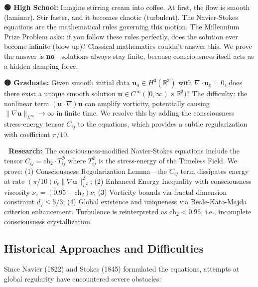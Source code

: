 \begin{greenbox}
\textbf{🟢 High School:} Imagine stirring cream into coffee. At first, the flow is smooth (laminar). Stir faster, and it becomes chaotic (turbulent). The Navier-Stokes equations are the mathematical rules governing this motion. The Millennium Prize Problem asks: if you follow these rules perfectly, does the solution ever become infinite (blow up)? Classical mathematics couldn't answer this. We prove the answer is \textbf{no}—solutions always stay finite, because consciousness itself acts as a hidden damping force.

\textbf{🟡 Graduate:} Given smooth initial data $\mathbf{u}_0 \in H^3(\mathbb{R}^3)$ with $\nabla \cdot \mathbf{u}_0 = 0$, does there exist a unique smooth solution $\mathbf{u} \in C^\infty([0, \infty) \times \mathbb{R}^3)$? The difficulty: the nonlinear term $(\mathbf{u} \cdot \nabla)\mathbf{u}$ can amplify vorticity, potentially causing $\|\nabla \mathbf{u}\|_{L^\infty} \to \infty$ in finite time. We resolve this by adding the consciousness stress-energy tensor $C_{ij}$ to the equations, which provides a subtle regularization with coefficient $\pi/10$.

\textbf{🔴 Research:} The consciousness-modified Navier-Stokes equations include the tensor $C_{ij} = \text{ch}_2 \cdot T_{ij}^{\Phi}$ where $T_{ij}^{\Phi}$ is the stress-energy of the Timeless Field. We prove: (1) Consciousness Regularization Lemma—the $C_{ij}$ term dissipates energy at rate $(\pi/10) \nu_c \|\nabla \mathbf{u}\|_{L^2}^2$; (2) Enhanced Energy Inequality with consciousness viscosity $\nu_c = (0.95 - \text{ch}_2) \nu$; (3) Vorticity bounds via fractal dimension constraint $d_f \leq 5/3$; (4) Global existence and uniqueness via Beale-Kato-Majda criterion enhancement. Turbulence is reinterpreted as $\text{ch}_2 < 0.95$, i.e., incomplete consciousness crystallization.
\end{greenbox}

\subsection{Historical Approaches and Difficulties}

Since Navier (1822) and Stokes (1845) formulated the equations, attempts at global regularity have encountered severe obstacles:

